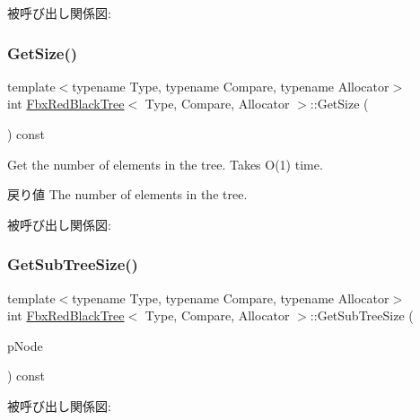 被呼び出し関係図\+:
\mbox{\label{class_fbx_red_black_tree_a99b4a611074bfd7b5a5165ca9cd9b14b}} 
\subsubsection{\texorpdfstring{Get\+Size()}{GetSize()}}
{\footnotesize\ttfamily template$<$typename Type, typename Compare, typename Allocator$>$ \\
int \hyperlink{class_fbx_red_black_tree}{Fbx\+Red\+Black\+Tree}$<$ Type, Compare, Allocator $>$\+::Get\+Size (\begin{DoxyParamCaption}{ }\end{DoxyParamCaption}) const}

Get the number of elements in the tree. Takes O(1) time. \begin{DoxyReturn}{戻り値}
The number of elements in the tree. 
\end{DoxyReturn}
被呼び出し関係図\+:
\mbox{\label{class_fbx_red_black_tree_a1eacc00900b47600528a379ed8882d0c}} 
\subsubsection{\texorpdfstring{Get\+Sub\+Tree\+Size()}{GetSubTreeSize()}}
{\footnotesize\ttfamily template$<$typename Type, typename Compare, typename Allocator$>$ \\
int \hyperlink{class_fbx_red_black_tree}{Fbx\+Red\+Black\+Tree}$<$ Type, Compare, Allocator $>$\+::Get\+Sub\+Tree\+Size (\begin{DoxyParamCaption}\item[{\hyperlink{class_fbx_red_black_tree_1_1_record_type}{Record\+Type} $\ast$}]{p\+Node }\end{DoxyParamCaption}) const\hspace{0.3cm}{\ttfamily [protected]}}

被呼び出し関係図\+:
\mbox{\label{class_fbx_red_black_tree_ab5f48f09ad534b7a11a45a4abe461b87}} 
